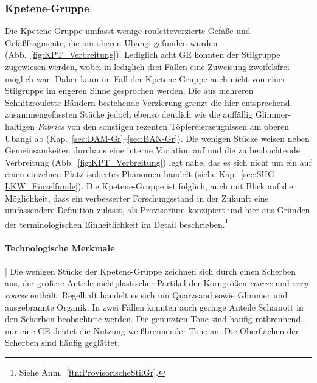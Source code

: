\subsubsection{Kpetene-Gruppe}\label{sec:KPT-Gr}

Die Kpetene-Gruppe umfasst wenige rouletteverzierte Gefäße und Gefäßfragmente, die am oberen \mbox{Ubangi} gefunden wurden (Abb.~\ref{fig:KPT_Verbreitung}). Lediglich acht GE konnten der Stilgruppe zugewiesen werden, wobei in lediglich drei Fällen eine Zuweisung zweifelsfrei möglich war. Daher kann im Fall der Kpetene-Gruppe auch nicht von einer Stilgruppe im engeren Sinne gesprochen werden. Die aus mehreren Schnitzroulette-Bändern bestehende Verzierung grenzt die hier entsprechend zusammengefassten Stücke jedoch ebenso deutlich wie die auffällig Glimmer-haltigen \textit{Fabrics} von den sonstigen rezenten Töpfereierzeugnissen am oberen \mbox{Ubangi} ab (Kap.~\ref{sec:DAM-Gr}--\ref{sec:BAN-Gr}). Die wenigen Stücke weisen neben Gemeinsamkeiten durchaus eine interne Variation auf und die zu beobachtende Verbreitung (Abb.~\ref{fig:KPT_Verbreitung}) legt nahe, das es sich nicht um ein auf einen einzelnen Platz isoliertes Phänomen handelt (siehe Kap.~\ref{sec:SHG-LKW_Einzelfunde}). Die Kpetene-Gruppe ist folglich, auch mit Blick auf die Möglichkeit, dass ein verbesserter Forschungsstand in der Zukunft eine umfassendere Definition zulässt, als Provisorium konzipiert und hier aus Gründen der terminologischen Einheitlichkeit im Detail beschrieben.\footnote{Siehe Anm.~\ref{ftn:ProvisorischeStilGr}.}

\paragraph{Technologische Merkmale}\hspace{-.5em}|\hspace{.5em}%
Die wenigen Stücke der Kpetene-Gruppe zeichnen sich durch einen Scherben aus, der größere Anteile nichtplastischer Partikel der Korngrößen \textit{coarse} und \textit{very coarse} enthält. Regelhaft handelt es sich um Quarzsand sowie Glimmer und ausgebrannte Organik. In zwei Fällen konnten auch geringe Anteile Schamott in den Scherben beobachtete werden. Die genutzten Tone sind häufig rotbrennend, nur eine GE deutet die Nutzung weißbrennender Tone an. Die Oberflächen der Scherben sind häufig geglättet.

